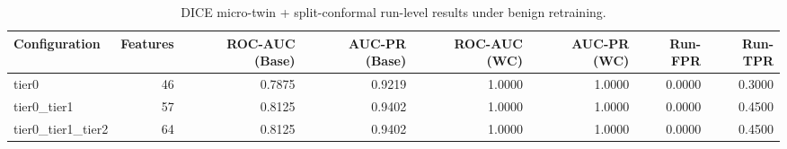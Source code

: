 \begin{table}[t]
\centering
\caption{DICE micro-twin + split-conformal run-level results under benign retraining.}
\label{tab:dice_full_overall}
\footnotesize
\begin{tabular}{lrrrrrrr}
\toprule
Configuration & Features & ROC-AUC (Base) & AUC-PR (Base) & ROC-AUC (WC) & AUC-PR (WC) & Run-FPR & Run-TPR \\
\midrule
tier0 & 46 & 0.7875 & 0.9219 & 1.0000 & 1.0000 & 0.0000 & 0.3000 \\
tier0_tier1 & 57 & 0.8125 & 0.9402 & 1.0000 & 1.0000 & 0.0000 & 0.4500 \\
tier0_tier1_tier2 & 64 & 0.8125 & 0.9402 & 1.0000 & 1.0000 & 0.0000 & 0.4500 \\
\bottomrule
\end{tabular}

\end{table}
